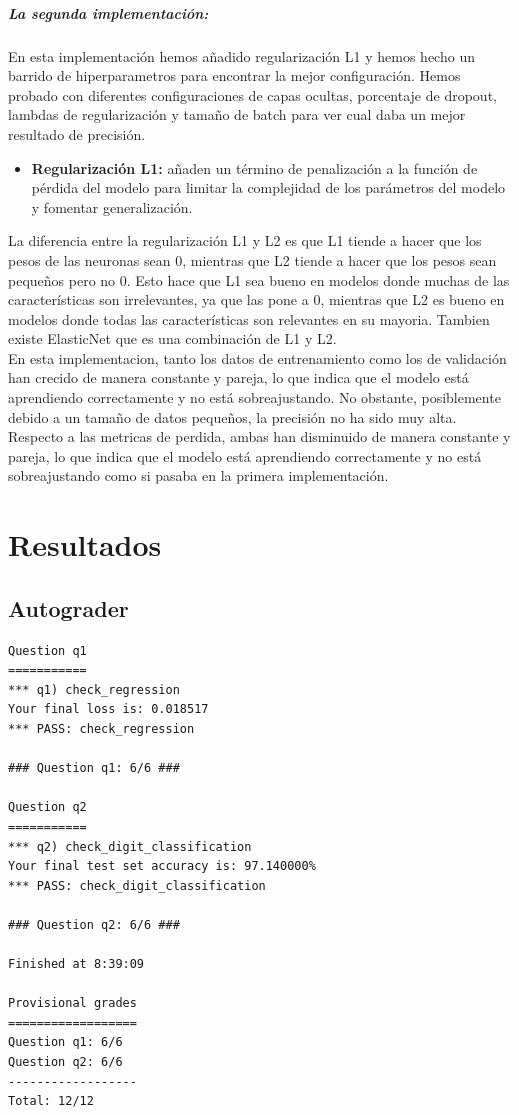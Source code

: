 \documentclass{report}
\begin{document}
        \paragraph*{La segunda implementación:}
        {
          En esta implementación hemos añadido regularización L1 y hemos hecho un barrido de hiperparametros para encontrar la mejor configuración.
          Hemos probado con diferentes configuraciones de capas ocultas, porcentaje de dropout, lambdas de regularización y tamaño de batch para ver cual daba un mejor resultado de precisión.

          \begin{itemize}
            \item \textbf{Regularización L1:} añaden un término de penalización a la función de pérdida del modelo para limitar la complejidad de los parámetros del modelo y fomentar generalización.
          \end{itemize}

          La diferencia entre la regularización L1 y L2 es que L1 tiende a hacer que los pesos de las neuronas sean 0, mientras que L2 tiende a hacer que los pesos sean pequeños pero no 0.
          Esto hace que L1 sea bueno en modelos donde muchas de las características son irrelevantes, ya que las pone a 0, mientras que L2 es bueno en modelos donde todas las características son relevantes en su mayoria.
          Tambien existe ElasticNet que es una combinación de L1 y L2.\\

          En esta implementacion, tanto los datos de entrenamiento como los de validación han crecido de manera constante y pareja, lo que indica que el modelo está aprendiendo correctamente y no está sobreajustando.
          No obstante, posiblemente debido a un tamaño de datos pequeños, la precisión no ha sido muy alta.\\

          Respecto a las metricas de perdida, ambas han disminuido de manera constante y pareja, lo que indica que el modelo está aprendiendo correctamente y no está sobreajustando como si pasaba en la primera implementación.
        }

  \chapter{Resultados}
    \section{Autograder}
      \begin{lstlisting}
Question q1
===========
*** q1) check_regression
Your final loss is: 0.018517
*** PASS: check_regression

### Question q1: 6/6 ###

Question q2
===========
*** q2) check_digit_classification
Your final test set accuracy is: 97.140000%
*** PASS: check_digit_classification

### Question q2: 6/6 ###

Finished at 8:39:09

Provisional grades
==================
Question q1: 6/6
Question q2: 6/6
------------------
Total: 12/12
    \end{lstlisting}
\end{document}
